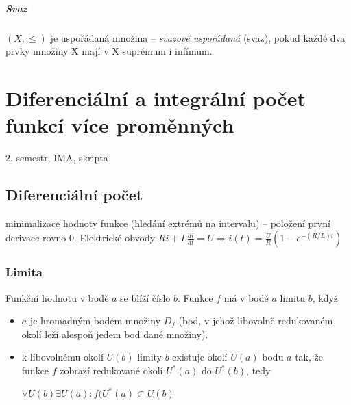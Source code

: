 \documentclass[a4paper, 11pt]{report}
\begin{document}
\paragraph{Svaz}
$(X, \leq)$ je uspořádaná množina -- \emph{svazově uspořádaná} (svaz), pokud každé dva prvky množiny X mají v X suprémum i infímum.








































\chapter{Diferenciální a integrální počet funkcí více proměnných} \label{cha:17}

2. semestr, IMA, skripta

\section{Diferenciální počet}
minimalizace hodnoty funkce (hledání extrémů na intervalu) -- položení první derivace rovno 0.
Elektrické obvody $Ri + L\frac{di}{dt} = U \Rightarrow i(t) = \frac{U}{R}\left(1-e^{-(R/L)t} \right)$

\subsection{Limita}
Funkční hodnotu v bodě $a$ se blíží číslo $b$. Funkce $f$ má v bodě $a$ limitu $b$, když
\begin{itemize}
	\item $a$ je hromadným bodem množiny $D_f$ (bod, v jehož libovolně redukovaném okolí leží alespoň jedem bod dané množiny).
	\item k libovolnému okolí $U(b)$ limity $b$ existuje okolí $U(a)$ bodu $a$ tak, že funkce $f$ zobrazí redukované okolí $U^*(a)$ do $U^*(b)$, tedy
	
	$\forall U(b) \exists U(a): f(U^*(a) \subset U(b)$
\end{itemize}
\end{document}
